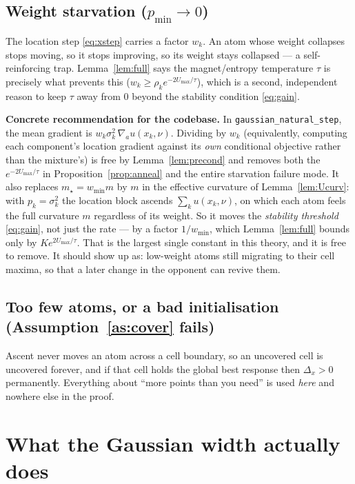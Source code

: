 \documentclass[11pt,a4paper]{article}
\theoremstyle{plain}
\theoremstyle{definition}
\theoremstyle{remark}
\begin{document}
\subsection{Weight starvation ($p_{\min}\to0$)}\label{sec:starve}
The location step \eqref{eq:xstep} carries a factor $w_k$. An atom whose weight
collapses stops moving, so it stops improving, so its weight stays collapsed --- a
self-reinforcing trap. Lemma~\ref{lem:full} says the magnet/entropy temperature
$\tau$ is precisely what prevents this ($w_k\ge\rho_ke^{-2U_{\max}/\tau}$), which is
a second, independent reason to keep $\tau$ away from $0$ beyond the stability
condition \eqref{eq:gain}.

\medskip
\noindent\textbf{Concrete recommendation for the codebase.} In
\texttt{gaussian\_natural\_step}, the mean gradient is
$w_k\sigma_k^2\,\nabla_a u(x_k,\nu)$. Dividing by $w_k$ (equivalently, computing each
component's location gradient against its \emph{own} conditional objective rather
than the mixture's) is free by Lemma~\ref{lem:precond} and removes both the
$e^{-2U_{\max}/\tau}$ in Proposition~\ref{prop:anneal} and the entire starvation
failure mode. It also replaces $m_\star=w_{\min}m$ by $m$ in the effective curvature
of Lemma~\ref{lem:Ucurv}: with $p_k=\sigma_k^2$ the location block ascends
$\sum_ku(x_k,\nu)$, on which each atom feels the full curvature $m$ regardless of its
weight. So it moves the \emph{stability threshold} \eqref{eq:gain}, not just the rate ---
by a factor $1/w_{\min}$, which Lemma~\ref{lem:full} bounds only by
$Ke^{2U_{\max}/\tau}$. That is the largest single constant in this theory, and it is
free to remove. It should show up as: low-weight atoms still migrating to their cell
maxima, so that a later change in the opponent can revive them.

\subsection{Too few atoms, or a bad initialisation (Assumption~\ref{as:cover} fails)}
Ascent never moves an atom across a cell boundary, so an uncovered cell is
uncovered forever, and if that cell holds the global best response then
$\Delta_x>0$ permanently. Everything about ``more points than you need'' is used
\emph{here} and nowhere else in the proof.

\section{What the Gaussian width actually does}\label{sec:anneal-sigma}
\end{document}
